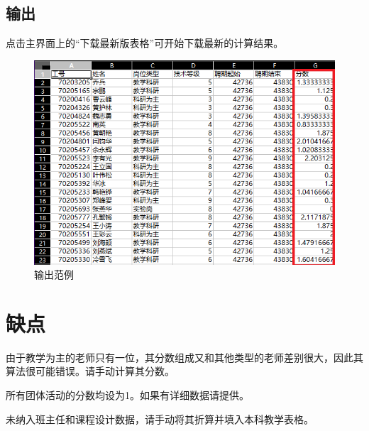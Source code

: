\documentclass[UTF8,fontset=windowsnew]{ctexart}
\begin{document}
\subsection{输出}
点击主界面上的``下载最新版表格''可开始下载最新的计算结果。
\begin{figure}[h]
  \centering
  \includegraphics[width=.5\textwidth]{image/output.png}
  \caption{输出范例}
  \label{fig:output}
\end{figure}
\section{缺点}
由于教学为主的老师只有一位，其分数组成又和其他类型的老师差别很大，因此其算法很可能错误。请手动计算其分数。\par
所有团体活动的分数均设为1。如果有详细数据请提供。\par
未纳入班主任和课程设计数据，请手动将其折算并填入本科教学表格。\par
\end{document}
